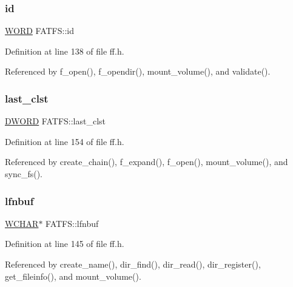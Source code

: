 \mbox{\label{structFATFS_a417095d7c20d56d417dc0998e0dd5a5c}} 
\subsubsection{\texorpdfstring{id}{id}}
{\footnotesize\ttfamily \hyperlink{ff_8h_a197942eefa7db30960ae396d68339b97}{W\+O\+RD} F\+A\+T\+F\+S\+::id}



Definition at line 138 of file ff.\+h.



Referenced by f\+\_\+open(), f\+\_\+opendir(), mount\+\_\+volume(), and validate().

\mbox{\label{structFATFS_ac26e848817569fedc15a9a4e49ddedd1}} 
\subsubsection{\texorpdfstring{last\+\_\+clst}{last\_clst}}
{\footnotesize\ttfamily \hyperlink{ff_8h_ad342ac907eb044443153a22f964bf0af}{D\+W\+O\+RD} F\+A\+T\+F\+S\+::last\+\_\+clst}



Definition at line 154 of file ff.\+h.



Referenced by create\+\_\+chain(), f\+\_\+expand(), f\+\_\+open(), mount\+\_\+volume(), and sync\+\_\+fs().

\mbox{\label{structFATFS_ad1999aa771ae428c3abe14dbe585e981}} 
\subsubsection{\texorpdfstring{lfnbuf}{lfnbuf}}
{\footnotesize\ttfamily \hyperlink{ff_8h_a0bb095da65fbe52192dd9e3e643c7568}{W\+C\+H\+AR}$\ast$ F\+A\+T\+F\+S\+::lfnbuf}



Definition at line 145 of file ff.\+h.



Referenced by create\+\_\+name(), dir\+\_\+find(), dir\+\_\+read(), dir\+\_\+register(), get\+\_\+fileinfo(), and mount\+\_\+volume().

